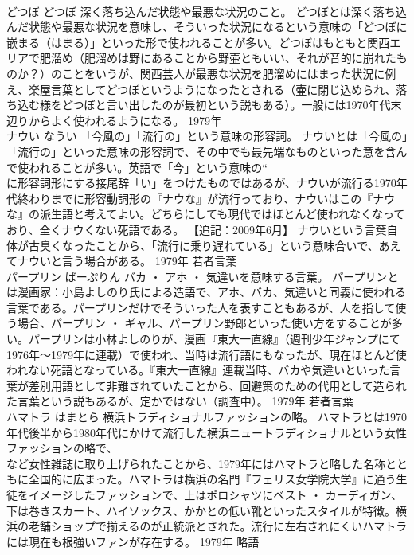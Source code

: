 \documentclass[8pt]{extreport}
\begin{document}
\begin{CJK}{UTF8}{min}
\\	どつぼ	どつぼ	深く落ち込んだ状態や最悪な状況のこと。	どつぼとは深く落ち込んだ状態や最悪な状況を意味し、そういった状況になるという意味の「どつぼに嵌まる（はまる）」といった形で使われることが多い。どつぼはもともと関西エリアで肥溜め（肥溜めは野にあることから野壷ともいい、それが音的に崩れたものか？）のことをいうが、関西芸人が最悪な状況を肥溜めにはまった状況に例え、楽屋言葉としてどつぼというようになったとされる（壷に閉じ込められ、落ち込む様をどつぼと言い出したのが最初という説もある）。一般には1970年代末辺りからよく使われるようになる。	1979年	
\\	ナウい	なうい	「今風の」「流行の」という意味の形容詞。	ナウいとは「今風の」「流行の」といった意味の形容詞で、その中でも最先端なものといった意を含んで使われることが多い。英語で「今」という意味の“
\\	に形容詞形にする接尾辞「い」をつけたものではあるが、ナウいが流行る1970年代終わりまでに形容動詞形の『ナウな』が流行っており、ナウいはこの『ナウな』の派生語と考えてよい。どちらにしても現代ではほとんど使われなくなっており、全くナウくない死語である。 【追記：2009年6月】 ナウいという言葉自体が古臭くなったことから、「流行に乗り遅れている」という意味合いで、あえてナウいと言う場合がある。	1979年	若者言葉	
\\	パープリン	ぱーぷりん	バカ ・ アホ ・ 気違いを意味する言葉。	パープリンとは漫画家：小島よしのり氏による造語で、アホ、バカ、気違いと同義に使われる言葉である。パープリンだけでそういった人を表すこともあるが、人を指して使う場合、パープリン ・ ギャル、パープリン野郎といった使い方をすることが多い。パープリンは小林よしのりが、漫画『東大一直線』（週刊少年ジャンプにて1976年～1979年に連載）で使われ、当時は流行語にもなったが、現在ほとんど使われない死語となっている。『東大一直線』連載当時、バカや気違いといった言葉が差別用語として非難されていたことから、回避策のための代用として造られた言葉という説もあるが、定かではない（調査中）。	1979年	若者言葉	
\\	ハマトラ	はまとら	横浜トラディショナルファッションの略。	ハマトラとは1970年代後半から1980年代にかけて流行した横浜ニュートラディショナルという女性ファッションの略で、
\\	など女性雑誌に取り上げられたことから、1979年にはハマトラと略した名称とともに全国的に広まった。ハマトラは横浜の名門『フェリス女学院大学』に通う生徒をイメージしたファッションで、上はポロシャツにベスト ・ カーディガン、下は巻きスカート、ハイソックス、かかとの低い靴といったスタイルが特徴。横浜の老舗ショップで揃えるのが正統派とされた。流行に左右されにくいハマトラには現在も根強いファンが存在する。	1979年	略語	

\end{CJK}
\end{document}
